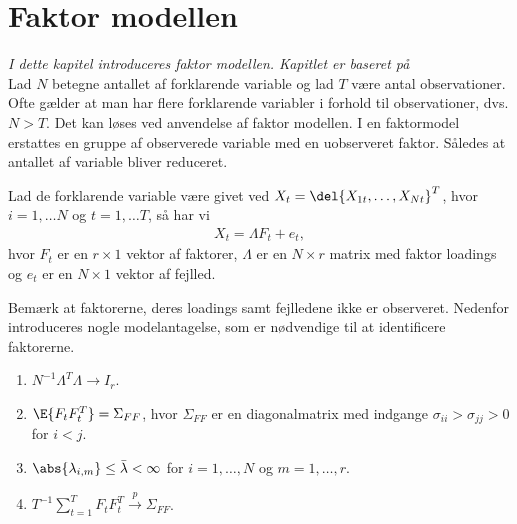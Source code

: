 \chapter{Faktor modellen}
\textit{I dette kapitel introduceres faktor modellen. Kapitlet er baseret på \citep{stock_watson_2002a}} \\[2mm]
%
Lad \(N\) betegne antallet af forklarende variable og lad \(T\) være antal observationer.
Ofte gælder at man har flere forklarende variabler i forhold til observationer, dvs. \(N > T\). 
Det kan løses ved anvendelse af faktor modellen. 
I en faktormodel erstattes en gruppe af observerede variable med en uobserveret faktor. Således at antallet af variable bliver reduceret.  

\begin{defn}[Faktor Model]
Lad de forklarende variable være givet ved $X_t = \del{X_{1t}, \dots, X_{Nt}}^T$, hvor $i = 1, \dots N$ og $t = 1, \dots T$, så har vi
\begin{align}
X_t = \Lambda F_t + e_t, \label{eq:factor_model}
\end{align}
hvor  \(F_t\) er en \(r \times 1\) vektor af faktorer, \(\Lambda\) er en \(N \times r\) matrix med faktor loadings og \(e_t\) er en \(N \times 1\) vektor af fejlled.
\end{defn}
Bemærk at faktorerne, deres loadings samt fejlledene ikke er observeret.
%
Nedenfor introduceres nogle modelantagelse, som er nødvendige til at identificere faktorerne.
%
\begin{ass} \label{ass:faktor}
\begin{enumerate}[label=\alph*)]
\item \(N^{-1} \Lambda^T \Lambda \rightarrow I_r\). 
\item \(\E{F_t F_t^T} = \Sigma_{FF}\), hvor \(\Sigma_{FF}\) er en diagonalmatrix med indgange \(\sigma_{ii} > \sigma_{jj} > 0\) for \(i < j\).
\item \(\abs{\lambda_{i,m}} \leq \bar{\lambda} < \infty\) for \(i = 1, \ldots, N\) og \(m = 1, \ldots, r\).
\item \(T^{-1} \sum_{t=1}^T F_t F_t^T \overset{p}{\rightarrow} \Sigma_{FF}\).
\end{enumerate}
\end{ass}
